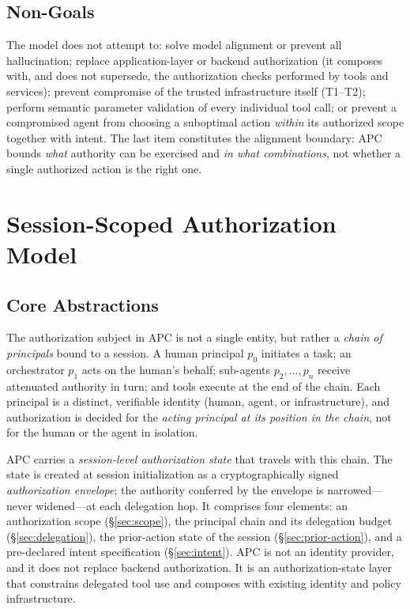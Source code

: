 \documentclass[sigconf,nonacm]{acmart}
\begin{document}
\subsection{Non-Goals}

The model does not attempt to: solve model alignment or prevent all hallucination; replace application-layer or backend authorization (it composes with, and does not supersede, the authorization checks performed by tools and services); prevent compromise of the trusted infrastructure itself (T1--T2); perform semantic parameter validation of every individual tool call; or prevent a compromised agent from choosing a suboptimal action \emph{within} its authorized scope together with intent. The last item constitutes the alignment boundary: APC bounds \emph{what} authority can be exercised and \emph{in what combinations}, not whether a single authorized action is the right one.

\section{Session-Scoped Authorization Model}\label{sec:model}

\subsection{Core Abstractions}\label{sec:core-abstractions}

The authorization subject in APC is not a single entity, but rather a \emph{chain of principals} bound to a session. A human principal $p_0$ initiates a task; an orchestrator $p_1$ acts on the human's behalf; sub-agents $p_2, \dots, p_n$ receive attenuated authority in turn; and tools execute at the end of the chain. Each principal is a distinct, verifiable identity (human, agent, or infrastructure), and authorization is decided for the \emph{acting principal at its position in the chain}, not for the human or the agent in isolation.

APC carries a \emph{session-level authorization state} that travels with this chain. The state is created at session initialization as a cryptographically signed \emph{authorization envelope}; the authority conferred by the envelope is narrowed---never widened---at each delegation hop. It comprises four elements: an authorization scope (\S\ref{sec:scope}), the principal chain and its delegation budget (\S\ref{sec:delegation}), the prior-action state of the session (\S\ref{sec:prior-action}), and a pre-declared intent specification (\S\ref{sec:intent}). APC is not an identity provider, and it does not replace backend authorization. It is an authorization-state layer that constrains delegated tool use and composes with existing identity and policy infrastructure.
\end{document}
